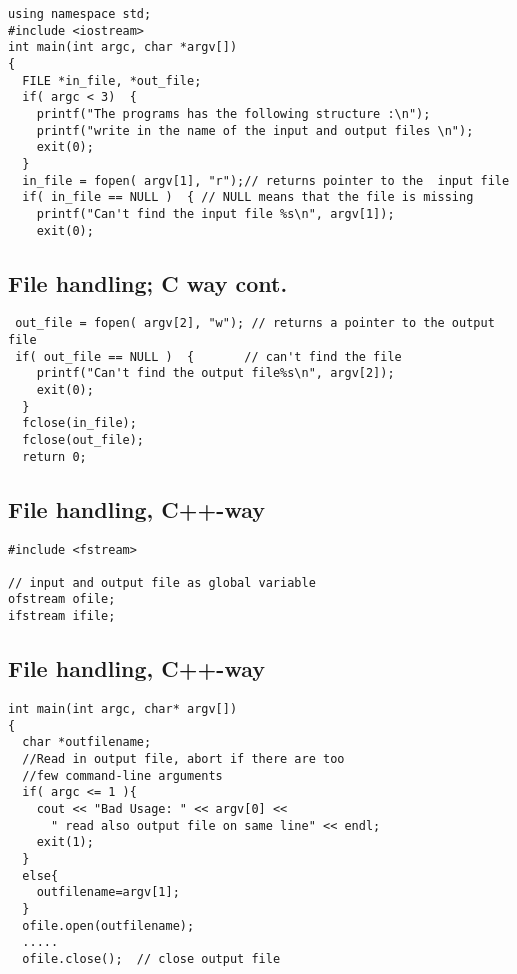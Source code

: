 \documentclass[%
oneside,                 %
final,                   %
10pt]{article}
\begin{document}
\begin{verbatim}
using namespace std;
#include <iostream>
int main(int argc, char *argv[])
{
  FILE *in_file, *out_file;
  if( argc < 3)  {
    printf("The programs has the following structure :\n");
    printf("write in the name of the input and output files \n");
    exit(0);
  }
  in_file = fopen( argv[1], "r");// returns pointer to the  input file
  if( in_file == NULL )  { // NULL means that the file is missing
    printf("Can't find the input file %s\n", argv[1]);
    exit(0);
\end{verbatim}

\subsection*{File handling; C way cont.}

\begin{verbatim}
 out_file = fopen( argv[2], "w"); // returns a pointer to the output file
 if( out_file == NULL )  {       // can't find the file
    printf("Can't find the output file%s\n", argv[2]);
    exit(0);
  }
  fclose(in_file);
  fclose(out_file);
  return 0;
\end{verbatim}

\subsection*{File handling, C++-way}

\begin{verbatim}
#include <fstream>

// input and output file as global variable
ofstream ofile;
ifstream ifile;
\end{verbatim}

\subsection*{File handling, C++-way}

\begin{verbatim}
int main(int argc, char* argv[])
{
  char *outfilename;
  //Read in output file, abort if there are too
  //few command-line arguments
  if( argc <= 1 ){
    cout << "Bad Usage: " << argv[0] <<
      " read also output file on same line" << endl;
    exit(1);
  }
  else{
    outfilename=argv[1];
  }
  ofile.open(outfilename);
  .....
  ofile.close();  // close output file
\end{verbatim}
\end{document}
